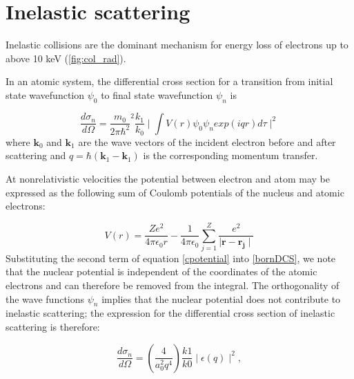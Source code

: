 \documentclass [11pt, proquest, article] {uwthesis}[2016/11/22]
\begin{document}

\section{Inelastic scattering}
Inelastic collisions are the dominant mechanism for energy loss of electrons up to above 10 keV (\ref{fig:col_rad}).

In an atomic system, the differential cross section for a transition from initial state wavefunction $\psi_0$ to final state wavefunction $\psi_n$ is

\begin{equation} \label{bornDCS}
\frac{d\sigma_n}{d\Omega} = \frac{m_0}{2\pi \hbar^2}^2 \frac{k_1}{k_0} \mid \int V(r) \psi_0 \psi_n exp(i q r) d\tau \mid ^2
\end{equation}
where $\textbf{k}_0$ and $\textbf{k}_1$ are the wave vectors of the incident electron before and after scattering and $q = \hbar (\textbf{k}_1 - \textbf{k}_1)$ is the corresponding momentum transfer. 

At nonrelativistic velocities the potential between electron and atom may be expressed as the following sum of Coulomb potentials of the nucleus and atomic electrons:

\begin{equation} \label{cpotential}
V(r) = \frac{Ze^2}{4\pi \epsilon_0 r} - \frac{1}{4 \pi \epsilon_0} \sum_{j = 1}^Z \frac{e^2}{\mid \mathbf{r} - \mathbf{r_j} \mid}
\end{equation}
Substituting the second term of equation \ref{cpotential} into \ref{bornDCS}, we note that the nuclear potential is independent of the coordinates of the atomic electrons and can therefore be removed from the integral. The orthogonality of the wave functions $\psi_n$ implies that the nuclear potential does not contribute to inelastic scattering; the expression for the differential cross section of inelastic scattering is therefore:

\begin{equation} \label{inelasticDCS}
\frac{d\sigma_n}{d\Omega} = (\frac{4}{a_0^2 q^4}) \frac{k1}{k0} \mid \epsilon(q)\mid^2,
\end{equation}
\end{document}
